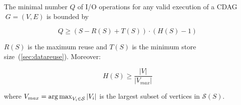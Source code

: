 \begin{lma}
	\label{lma:reuse}
	The minimal number $Q$ of I/O operations for any valid execution of a CDAG 
	$\ G=(V,E)$ is bounded by  
	
	\vspace{-0.5em}
	\begin{equation}
	Q \ge (S - R(S) + T(S)) \cdot (H(S) - 1)
	\label{eq:reusebound} \end{equation}
	\vspace{-0.5em}
	
	\noindent
	$R(S)$ is the maximum reuse and $T(S)$ is the minimum store 
	size~(\cref{sec:datareuse}).
	Moreover: 
	
	\vspace{-0.5em}
	\begin{equation}\label{eq:reusebound-pmax}
	H(S) \ge \frac{|V|}{|V_{max}|}
	\end{equation}
	\vspace{-0.5em}
	
	\noindent
	where $V_{max} = \operatorname*{arg\,max}_{V_i \in \mathcal{S}}|V_i|$ is 
	the largest
	subset of vertices in $\mathcal{S}(S)$.
	
\end{lma}

